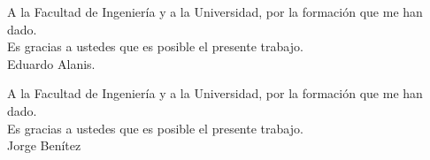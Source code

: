 \begin{dedication}
A la Facultad de Ingeniería y a la  Universidad, por la formación que me han dado.\\
Es gracias a ustedes que es posible el presente trabajo.\\

Eduardo Alanis.\\
\bigskip

A la Facultad de Ingeniería y a la  Universidad, por la formación que me han dado.\\
Es gracias a ustedes que es posible el presente trabajo.\\

Jorge Benítez
\end{dedication}

